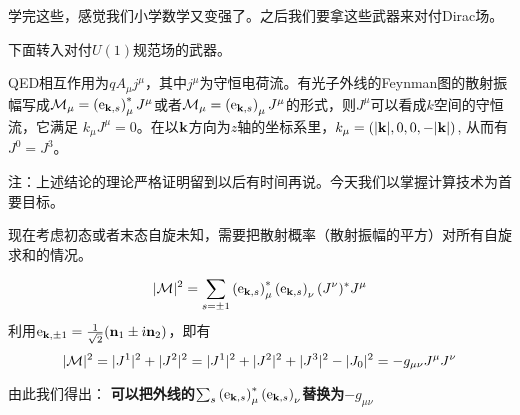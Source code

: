 \documentclass[CJK]{beamer}
\begin{document}
\begin{frame}
\bch
学完这些，感觉我们小学数学又变强了。之后我们要拿这些武器来对付Dirac场。
\skiplines

下面转入对付$U(1)$规范场的武器。
\ech
\end{frame}

\begin{frame}
\bch
{\small
QED相互作用为$qA_\mu j^\mu$，其中$j^\mu$为守恒电荷流。有光子外线的Feynman图的散射振幅写成${\mathcal{M}}_\mu = \left(\mathrm{e}_{{\mathbf{k}},s}\right)_\mu^* J^\mu$或者${\mathcal{M}}_\mu = \left(\mathrm{e}_{{\mathbf{k}},s}\right)_\mu J^\mu$的形式，则$J^\mu$可以看成$k$空间的守恒流，它满足
$k_\mu J^\mu = 0$。在以${\mathbf{k}}$方向为$z$轴的坐标系里，$k_\mu =(|{\mathbf{k}}|, 0, 0, -|{\mathbf{k}}|)$, 从而有$J^0 = J^3$。

{\scriptsize 注：上述结论的理论严格证明留到以后有时间再说。今天我们以掌握计算技术为首要目标。}

现在考虑初态或者末态自旋未知，需要把散射概率（散射振幅的平方）对所有自旋求和的情况。

$$|{\mathcal{M}}|^2 = \sum_{s=\pm 1} \left(\mathrm{e}_{{\mathbf{k}},s}\right)^*_\mu \left(\mathrm{e}_{{\mathbf{k}},s}\right)_\nu (J^\nu)^*J^\mu $$
利用$\mathrm{e}_{{\mathbf{k}},\pm 1} = \frac{1}{\sqrt{2}}( {\mathbf{n}}_1 \pm {\dot{\imath}} {\mathbf{n}}_2)$，即有
$$|{\mathcal{M}}|^2 = |J^1|^2 + |J^2|^2 =  |J^1|^2 + |J^2|^2 + |J^3|^2 - |J_0|^2 = -g_{\mu\nu}J^\mu J^\nu $$

由此我们得出：
{\bf 可以把外线的$\sum_{s} \left(\mathrm{e}_{{\mathbf{k}},s}\right)^*_\mu \left(\mathrm{e}_{{\mathbf{k}},s}\right)_\nu$替换为$-g_{\mu\nu}$}
}

\ech

\end{frame}
\end{document}

